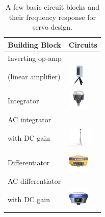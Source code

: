 \begin{table}[ht] 
    \centering 
    \begin{tabular}{  >{\raggedright}m{4.5cm}  m{5cm}}      %
    \toprule                                   %
    Building Block  & Circuits\\  %
    \midrule\addlinespace[1.5ex]
            Inverting op-amp\\
            (linear amplifier)
            & \includegraphics[height=1cm]{Chapters/Figures/base_stations/beRTK_2.png} \\
    \midrule\addlinespace[1.5ex]
            Integrator 
            & \includegraphics[height=1cm]{Chapters/Figures/base_stations/REACH-RS2.png} \\
    \midrule\addlinespace[1.5ex]
            AC integrator \\ with DC gain
            & \includegraphics[height=1cm]{Chapters/Figures/base_stations/d-rtk-2.png} \\
    \midrule\addlinespace[1.5ex]
            Differentiator
            & \includegraphics[height=1cm]{Chapters/Figures/base_stations/HiPer-V.png} \\
    \midrule\addlinespace[1.5ex]
            AC differentiator \\ with DC gain
            & \includegraphics[height=1cm]{Chapters/Figures/base_stations/S990A.png} \\
    \bottomrule
        \end{tabular}
        \caption{A few basic circuit blocks and their frequency response for servo design.}
        \label{table4.2}
\end{table}
